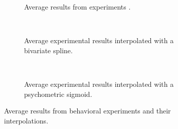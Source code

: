 \begin{multicols}{2}
\begin{figure}[H]
     \centering
    \begin{subfigure}[t]{0.41\textwidth}
        \centering
        
        \vspace{-\baselineskip}
        \caption{Average results from experiments \cite{MaryamPLACEHOLDER}.}
        \label{fig:exp-res}
    \end{subfigure}
    \\ \vspace{\baselineskip}
    \begin{subfigure}[t]{0.41\textwidth}
        \centering
        
        \vspace{-\baselineskip}
        \caption{Average experimental results interpolated with a bivariate spline.}
        \label{fig:exp-res-spline}
    \end{subfigure}
    \\ \vspace{\baselineskip}
    \begin{subfigure}[t]{0.41\textwidth}
        \centering
        
        \vspace{-\baselineskip}
        \caption{Average experimental results interpolated with a psychometric sigmoid.}
        \label{fig:exp-res-sigmoid}
    \end{subfigure}
    \caption[Experimental results]{Average results from behavioral experiments and their interpolations.}
    \label{fig:all-exp-res}
\end{figure}

\end{multicols}

